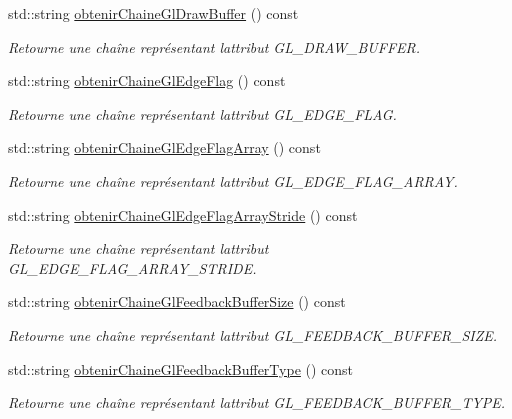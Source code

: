 \begin{DoxyCompactItemize}
std\+::string \hyperlink{group__utilitaire_ga3b705291c7da107645656d5dfb51872a}{obtenir\+Chaine\+Gl\+Draw\+Buffer} () const 
\begin{DoxyCompactList}\small\item\em Retourne une chaîne représentant l\textquotesingle{}attribut G\+L\+\_\+\+D\+R\+A\+W\+\_\+\+B\+U\+F\+F\+E\+R. \end{DoxyCompactList}\item 
std\+::string \hyperlink{group__utilitaire_ga982e0dacd18861db40bc153b8e7748d6}{obtenir\+Chaine\+Gl\+Edge\+Flag} () const 
\begin{DoxyCompactList}\small\item\em Retourne une chaîne représentant l\textquotesingle{}attribut G\+L\+\_\+\+E\+D\+G\+E\+\_\+\+F\+L\+A\+G. \end{DoxyCompactList}\item 
std\+::string \hyperlink{group__utilitaire_gac69166db434f3671eb241b00786be34b}{obtenir\+Chaine\+Gl\+Edge\+Flag\+Array} () const 
\begin{DoxyCompactList}\small\item\em Retourne une chaîne représentant l\textquotesingle{}attribut G\+L\+\_\+\+E\+D\+G\+E\+\_\+\+F\+L\+A\+G\+\_\+\+A\+R\+R\+A\+Y. \end{DoxyCompactList}\item 
std\+::string \hyperlink{group__utilitaire_ga12932637a943b952d6c822af48b4102a}{obtenir\+Chaine\+Gl\+Edge\+Flag\+Array\+Stride} () const 
\begin{DoxyCompactList}\small\item\em Retourne une chaîne représentant l\textquotesingle{}attribut G\+L\+\_\+\+E\+D\+G\+E\+\_\+\+F\+L\+A\+G\+\_\+\+A\+R\+R\+A\+Y\+\_\+\+S\+T\+R\+I\+D\+E. \end{DoxyCompactList}\item 
std\+::string \hyperlink{group__utilitaire_gab0ae8d230f1fe733862032e082cfbd2f}{obtenir\+Chaine\+Gl\+Feedback\+Buffer\+Size} () const 
\begin{DoxyCompactList}\small\item\em Retourne une chaîne représentant l\textquotesingle{}attribut G\+L\+\_\+\+F\+E\+E\+D\+B\+A\+C\+K\+\_\+\+B\+U\+F\+F\+E\+R\+\_\+\+S\+I\+Z\+E. \end{DoxyCompactList}\item 
std\+::string \hyperlink{group__utilitaire_ga30bdbc77ee2c0b27ee48e5de2654d29c}{obtenir\+Chaine\+Gl\+Feedback\+Buffer\+Type} () const 
\begin{DoxyCompactList}\small\item\em Retourne une chaîne représentant l\textquotesingle{}attribut G\+L\+\_\+\+F\+E\+E\+D\+B\+A\+C\+K\+\_\+\+B\+U\+F\+F\+E\+R\+\_\+\+T\+Y\+P\+E. \end{DoxyCompactList}\item 

\end{DoxyCompactItemize}
